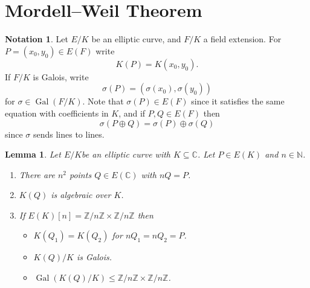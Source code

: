 \documentclass[a4paper]{article}
\theoremstyle{plain}
\newtheorem{lemma}[theorem]{Lemma}
\theoremstyle{remark}
\theoremstyle{definition}
\newtheorem*{notation}{Notation}
\DeclareMathOperator{\Gal}{Gal}
\newcommand{\N}{\mathbb{N}}
\newcommand{\Z}{\mathbb{Z}}
\newcommand{\C}{\mathbb{C}}
\begin{document}
\section{Mordell--Weil Theorem}

\begin{notation}
    Let $E/K$ be an elliptic curve, and $F/K$ a field extension. For
    $P=(x_0,y_0)\in E(F)$ write
    \begin{equation*}
        K(P) = K(x_0,y_0).
    \end{equation*}
    If $F/K$ is Galois, write
    \begin{equation*}
        \sigma(P) = (\sigma(x_0),\sigma(y_0))
    \end{equation*}
    for $\sigma\in\Gal(F/K)$. Note that $\sigma(P)\in E(F)$ since it satisfies
    the same equation with coefficients in $K$, and if $P,Q\in E(F)$ then
    \begin{equation*}
        \sigma(P\oplus Q)=\sigma(P)\oplus\sigma(Q)
    \end{equation*}
    since $\sigma$ sends lines to lines.
\end{notation}

\begin{lemma}
    Let $E/K$be an elliptic curve with $K\subseteq\C$. Let $P\in E(K)$ and
    $n\in\N$.
    \begin{enumerate}[label=(\roman*)]
        \item There are $n^2$ points $Q\in E(\C)$ with $nQ=P$.
        \item $K(Q)$ is algebraic over $K$.
        \item If $E(K)[n]=\Z/n\Z\times\Z/n\Z$ then
            \begin{itemize}
                \item $K(Q_1)=K(Q_2)$ for $nQ_1=nQ_2=P$.
                \item $K(Q)/K$ is Galois.
                \item $\Gal(K(Q)/K)\le\Z/n\Z\times\Z/n\Z$.
            \end{itemize}
    \end{enumerate}
\end{lemma}
\end{document}
